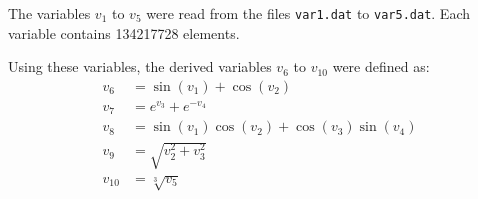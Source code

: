 
The variables $v_1$ to $v_5$ were read from the files \verb|var1.dat| to \verb|var5.dat|. Each variable contains 134217728 elements.

Using these variables, the derived variables $v_6$ to $v_{10}$ were defined as:
\begin{equation}
    \begin{aligned}
        v_6     &= \sin(v_1) + \cos(v_2)\\
        v_7     &= e^{v_3} + e^{-v_4}\\
        v_8     &= \sin(v_1)\cos(v_2) + \cos(v_3)\sin(v_4)\\
        v_9     &= \sqrt{v_2^2 + v_3^2}\\
        v_{10}  &= \sqrt[3]{v_5}
    \end{aligned}
\end{equation}

